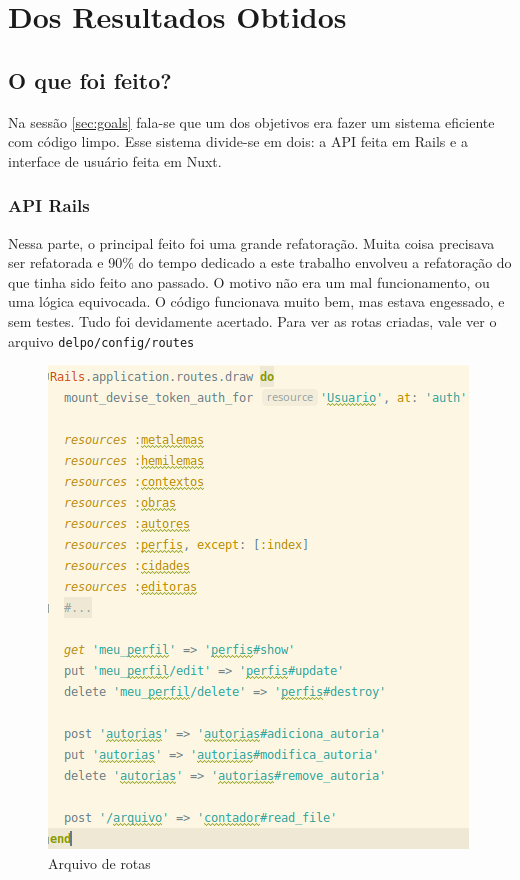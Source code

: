
\chapter{Dos Resultados Obtidos}
\label{cap:results}
\minitoc


\section{O que foi feito?}
\label{sec:to-be-done}

Na sessão \ref{sec:goals} fala-se que um dos objetivos era fazer um sistema eficiente com código limpo. Esse sistema
divide-se em dois: a API feita em Rails e a interface de usuário feita em Nuxt.

\subsection{API Rails}\label{subsec:api-rails}

Nessa parte, o principal feito foi uma grande refatoração. Muita coisa precisava ser refatorada e 90\% do tempo dedicado
a este trabalho envolveu a refatoração do que tinha sido feito ano passado. O motivo não era um mal funcionamento, ou
uma lógica equivocada. O código funcionava muito bem, mas estava engessado, e sem testes. Tudo foi devidamente acertado.
Para ver as rotas criadas, vale ver o arquivo \texttt{delpo/config/routes}

\begin{figure}[h]
  \centering
  \includegraphics[width=.6\textwidth]{figuras/rails_routes.png}
  \caption{Arquivo de rotas}
  \label{fig:routes_files}
\end{figure}

